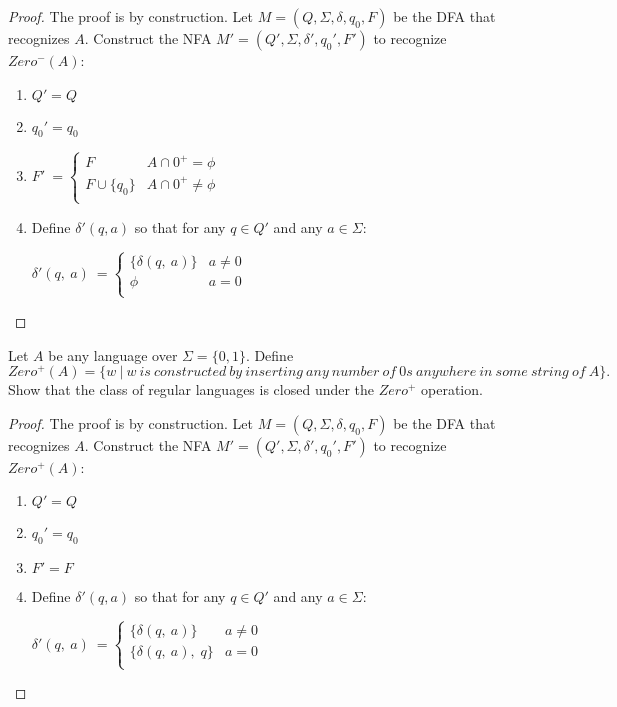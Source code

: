 \documentclass[11pt]{article}
\newenvironment{corollary}[2][Corollary]{\begin{trivlist}
\item[\hskip \labelsep {\bfseries #1}\hskip \labelsep {\bfseries #2.}]}{\end{trivlist}}
\begin{document}
\begin{proof}
The proof is by construction. Let $M = (Q, \Sigma, \delta, q_{0}, F)$ be the DFA that recognizes $A$. Construct the NFA $M' = (Q', \Sigma, \delta', q_{0}', F')$ to recognize $Zero^{-}(A)$:
\begin{enumerate}
\item $Q' = Q$
\item $q_{0}' = q_{0}$
\item $\displaystyle F' \ =\begin{cases}
F & A \cap {0}^{+} = \phi \\
F \cup \{q_{0}\} & A \cap {0}^{+} \neq \phi \\
\end{cases} \ \ $
\item Define $\delta'(q, a)$ so that for any $q \in Q'$ and any $a \in \Sigma$:
\begin{center}
$\displaystyle \delta'( q,\ a) \ =\begin{cases}
\{ \delta( q,\ a) \} & a \neq 0 \\
\phi & a = 0 \\
\end{cases} \ \ $
\end{center}
\end{enumerate}
\end{proof}

\begin{corollary}{2}
Let $A$ be any language over $\Sigma = \{0, 1\}$. Define
\[
Zero^{+}(A) = \{ w \ | \ w \ is \ constructed \ by \ inserting \ any \ number \ of \ 0s \ anywhere \ in \ some \ string \ of \ A \}.
\]
Show that the class of regular languages is closed under the $Zero^{+}$ operation.
\end{corollary}

\begin{proof}
The proof is by construction. Let $M = (Q, \Sigma, \delta, q_{0}, F)$ be the DFA that recognizes $A$. Construct the NFA $M' = (Q', \Sigma, \delta', q_{0}', F')$ to recognize $Zero^{+}(A)$:
\begin{enumerate}
\item $Q' = Q$
\item $q_{0}' = q_{0}$
\item $F' = F$
\item Define $\delta'(q, a)$ so that for any $q \in Q'$ and any $a \in \Sigma$:
\begin{center}
$\displaystyle \delta'( q,\ a) \ =\begin{cases}
\{ \delta( q,\ a) \} & a \neq 0 \\
\{ \delta( q,\ a), \; q \} & a = 0 \\
\end{cases} \ \ $
\end{center}
\end{enumerate}
\end{proof}
\end{document}
